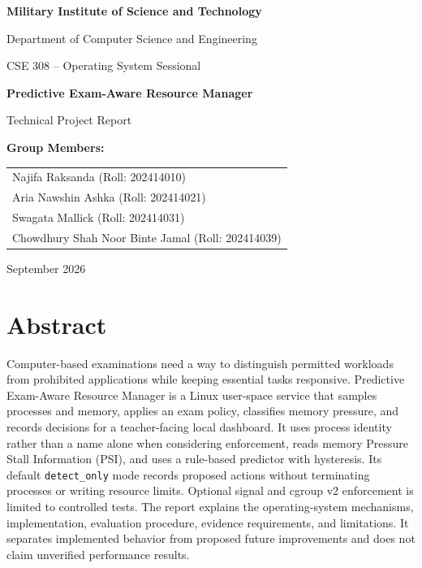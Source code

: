 \documentclass[12pt,a4paper]{article}
\newcommand{\project}{Predictive Exam-Aware Resource Manager}
\newcommand{\code}[1]{\texttt{#1}}
\begin{document}
\begin{titlepage}
\centering
\vspace*{1.7cm}
{\Large\bfseries Military Institute of Science and Technology\par}
\vspace{0.25cm}
{\large Department of Computer Science and Engineering\par}
\vspace{1.3cm}
{\Large CSE 308 -- Operating System Sessional\par}
\vspace{0.9cm}
{\Huge\bfseries Predictive Exam-Aware Resource Manager\par}
\vspace{0.5cm}
{\LARGE Technical Project Report\par}
\vspace{1.3cm}
{\large\bfseries Group Members:\par}
\vspace{0.3cm}
\begin{tabular}{l}
Najifa Raksanda (Roll: 202414010)\\[0.15cm]
Aria Nawshin Ashka (Roll: 202414021)\\[0.15cm]
Swagata Mallick (Roll: 202414031)\\[0.15cm]
Chowdhury Shah Noor Binte Jamal (Roll: 202414039)
\end{tabular}
\vfill
{\large September 2026\par}
\end{titlepage}

\section*{Abstract}
Computer-based examinations need a way to distinguish permitted workloads from prohibited applications while keeping essential tasks responsive. \project{} is a Linux user-space service that samples processes and memory, applies an exam policy, classifies memory pressure, and records decisions for a teacher-facing local dashboard. It uses process identity rather than a name alone when considering enforcement, reads memory Pressure Stall Information (PSI), and uses a rule-based predictor with hysteresis. Its default \code{detect\_only} mode records proposed actions without terminating processes or writing resource limits. Optional signal and cgroup v2 enforcement is limited to controlled tests. The report explains the operating-system mechanisms, implementation, evaluation procedure, evidence requirements, and limitations. It separates implemented behavior from proposed future improvements and does not claim unverified performance results.
\end{document}
